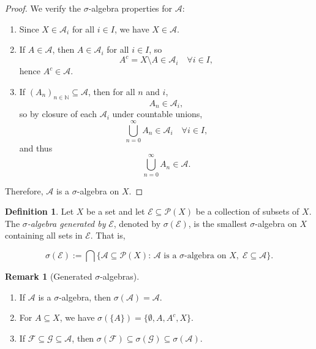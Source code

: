 \documentclass{article}
\theoremstyle{definition}
\newtheorem{definition}{Definition}[section]
\newtheorem{remark}{Remark}[section]
\begin{document}
\begin{proof}
We verify the $\sigma$-algebra properties for $\mathcal{A}$:
\begin{enumerate}
    \item Since $X \in \mathcal{A}_i$ for all $i \in I$, we have $X \in \mathcal{A}$.
    \item If $A \in \mathcal{A}$, then $A \in \mathcal{A}_i$ for all $i \in I$, so
    \[
    A^c = X \setminus A \in \mathcal{A}_i \quad \forall i \in I,
    \]
    hence $A^c \in \mathcal{A}$.
    \item If $(A_n)_{n \in \mathbb{N}} \subseteq \mathcal{A}$, then for all $n$ and $i$,
    \[
    A_n \in \mathcal{A}_i,
    \]
    so by closure of each $\mathcal{A}_i$ under countable unions,
    \[
    \bigcup_{n=0}^\infty A_n \in \mathcal{A}_i \quad \forall i \in I,
    \]
    and thus
    \[
    \bigcup_{n=0}^\infty A_n \in \mathcal{A}.
    \]
\end{enumerate}
Therefore, $\mathcal{A}$ is a $\sigma$-algebra on $X$.
\end{proof}


\medskip
\begin{definition}
Let $X$ be a set and let $\mathcal{E} \subseteq \mathcal{P}(X)$ be a collection of subsets of $X$. The \textit{$\sigma$-algebra generated by} $\mathcal{E}$, denoted by $\sigma(\mathcal{E})$, is the smallest $\sigma$-algebra on $X$ containing all sets in $\mathcal{E}$. That is,

\[
\sigma(\mathcal{E}) := \bigcap \big\{ \mathcal{A} \subseteq \mathcal{P}(X) :\, \mathcal{A} \text{ is a } \sigma\text{-algebra on } X, \; \mathcal{E} \subseteq \mathcal{A} \big\}.
\]
\end{definition}


\medskip
\begin{remark}[Generated $\sigma$-algebras]
\leavevmode
\begin{enumerate}
    \item If $\mathcal{A}$ is a $\sigma$-algebra, then $\sigma(\mathcal{A}) = \mathcal{A}$.
    \item For $A \subseteq X$, we have $\sigma(\{A\}) = \{\emptyset, A, A^c, X\}$.
    \item If $\mathcal{F} \subseteq \mathcal{G} \subseteq \mathcal{A}$, then $\sigma(\mathcal{F}) \subseteq \sigma(\mathcal{G}) \subseteq \sigma(\mathcal{A})$.
\end{enumerate}
\end{remark}
\end{document}
